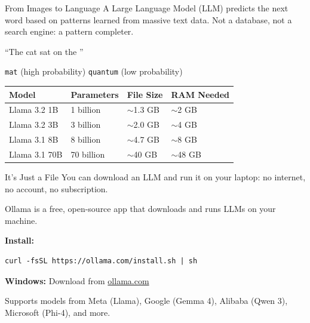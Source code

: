 \documentclass[aspectratio=169]{beamer}
\begin{document}
\begin{frame}{From Images to Language}
    A Large Language Model (LLM) predicts the next word based on patterns learned from massive text data. Not a database, not a search engine: a pattern completer.

    \vspace{0.8em}
    \begin{center}
        ``The cat sat on the \underline{\hspace{2cm}}''

        \vspace{0.3em}
        \texttt{mat} (high probability) \hspace{2em} \texttt{quantum} (low probability)
    \end{center}

    \vspace{0.8em}
    \begin{table}
        \centering
        \begin{tabular}{llll}
            \toprule
            \textbf{Model} & \textbf{Parameters} & \textbf{File Size} & \textbf{RAM Needed} \\
            \midrule
            Llama 3.2 1B  & 1 billion  & $\sim$1.3 GB & $\sim$2 GB \\
            Llama 3.2 3B  & 3 billion  & $\sim$2.0 GB & $\sim$4 GB \\
            Llama 3.1 8B  & 8 billion  & $\sim$4.7 GB & $\sim$8 GB \\
            Llama 3.1 70B & 70 billion & $\sim$40 GB  & $\sim$48 GB \\
            \bottomrule
        \end{tabular}
    \end{table}
\end{frame}


\begin{frame}[fragile]{It's Just a File}
    You can download an LLM and run it on your laptop: no internet, no account, no subscription.

    \vspace{0.8em}
    Ollama is a free, open-source app that downloads and runs LLMs on your machine.

    \vspace{0.8em}
    \textbf{Install:}
    \begin{lstlisting}
curl -fsSL https://ollama.com/install.sh | sh
    \end{lstlisting}
    \textbf{Windows:} Download from \href{https://ollama.com}{ollama.com}

    \vspace{0.8em}
    Supports models from Meta (Llama), Google (Gemma 4), Alibaba (Qwen 3), Microsoft (Phi-4), and more.
\end{frame}
\end{document}
